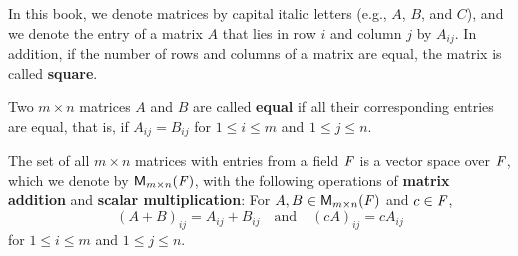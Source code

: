 \begin{defn}\label{1.2.7}
	In this book, we denote matrices by capital italic letters (e.g., \(A\), \(B\), and \(C\)), and we denote the entry of a matrix \(A\) that lies in row \(i\) and column \(j\) by \(A_{i j}\).
	In addition, if the number of rows and columns of a matrix are equal, the matrix is called \textbf{square}.
\end{defn}

\begin{defn}\label{1.2.8}
	Two \(m \times n\) matrices \(A\) and \(B\) are called \textbf{equal} if all their corresponding entries are equal, that is, if \(A_{i j} = B_{i j}\) for \(1 \leq i \leq m\) and \(1 \leq j \leq n\).
\end{defn}

\begin{eg}\label{1.2.9}
	The set of all \(m \times n\) matrices with entries from a field \(\mathit{F}\) is a vector space over \(\mathit{F}\), which we denote by \(\mathsf{M}_{{m} \times n}({\mathit{F}})\), with the following operations of \textbf{matrix addition} and \textbf{scalar multiplication}:
	For \(A, B \in \mathsf{M}_{{m} \times n}({\mathit{F}})\) and \(c \in \mathit{F}\),
	\[
		(A + B)_{i j} = A_{i j} + B_{i j} \quad \text{and} \quad (c A)_{i j} = c A_{i j}
	\]
	for \(1 \leq i \leq m\) and \(1 \leq j \leq n\).
\end{eg}


